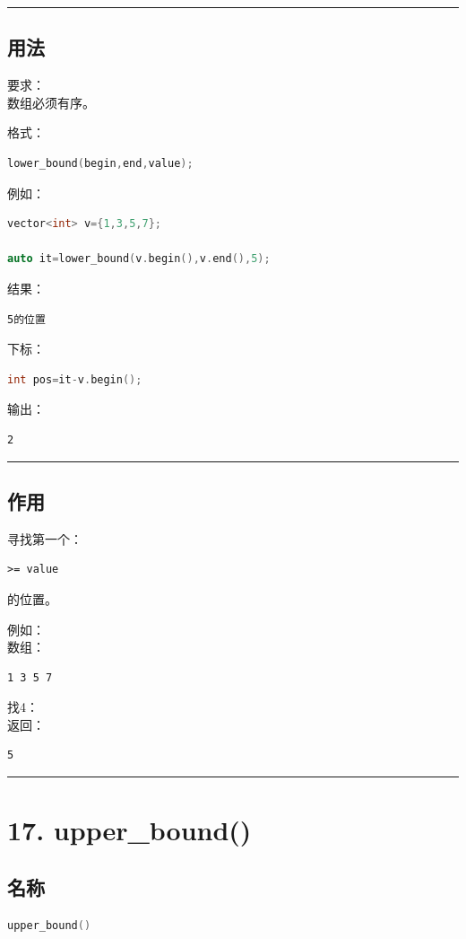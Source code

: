 \documentclass[10pt,twocolumn]{extarticle}
\begin{document}
\noindent\rule{\linewidth}{0.4pt}

\subsection{用法}
要求：\\
数组必须有序。

格式：
\begin{lstlisting}[language=C++]
lower_bound(begin,end,value);
\end{lstlisting}
例如：
\begin{lstlisting}[language=C++]
vector<int> v={1,3,5,7};

auto it=lower_bound(v.begin(),v.end(),5);
\end{lstlisting}
结果：
\begin{lstlisting}
5的位置
\end{lstlisting}
下标：
\begin{lstlisting}[language=C++]
int pos=it-v.begin();
\end{lstlisting}
输出：
\begin{lstlisting}
2
\end{lstlisting}

\noindent\rule{\linewidth}{0.4pt}

\subsection{作用}
寻找第一个：
\begin{lstlisting}
>= value
\end{lstlisting}
的位置。

例如：\\
数组：
\begin{lstlisting}
1 3 5 7
\end{lstlisting}
找4：\\
返回：
\begin{lstlisting}
5
\end{lstlisting}

\noindent\rule{\linewidth}{0.4pt}

\section{17. upper\_bound()}

\subsection{名称}
\begin{lstlisting}[language=C++]
upper_bound()
\end{lstlisting}
\end{document}
